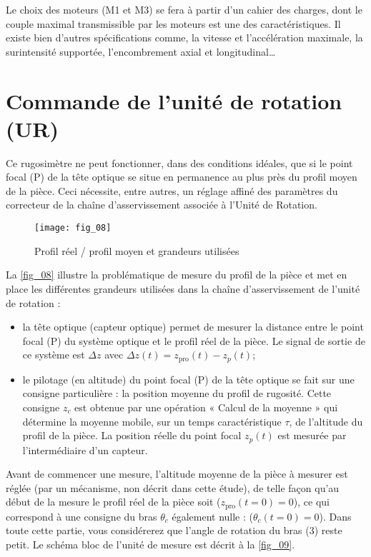\ifprof
\else
Le choix des moteurs (M1 et M3) se fera à partir d’un cahier des charges, dont le couple maximal
transmissible par les moteurs est une des caractéristiques. Il existe bien d’autres spécifications comme, la
vitesse et l’accélération maximale, la surintensité supportée, l’encombrement axial et longitudinal…
\fi

\section{Commande de l'unité de rotation (UR)}

Ce rugosimètre ne peut fonctionner, dans des conditions idéales, que si le point focal (P) de la tête optique
se situe en permanence au plus près du profil moyen de la pièce. Ceci nécessite, entre autres, un réglage
affiné des paramètres du correcteur de la chaîne d’asservissement associée à l’Unité de Rotation.

\begin{figure}[H]
\centering
\texttt{[image: fig\_08]}
\caption{\label{fig_08} Profil réel / profil moyen et grandeurs utilisées}
\end{figure}

La \autoref{fig_08} illustre la problématique de mesure du profil de la pièce et met en place les différentes
grandeurs utilisées dans la chaîne d’asservissement de l’unité de rotation :
\begin{itemize}
\item la tête optique (capteur optique) permet de mesurer la distance entre le point focal (P) du système
optique et le profil réel de la pièce. Le signal de sortie de ce système est $\Delta z$ avec
$\Delta z(t)=z_{\text{pro}}(t)-z_p(t)$;
\item le pilotage (en altitude) du point focal (P) de la tête optique se fait sur une consigne particulière : la
position moyenne du profil de rugosité. Cette consigne $z_c$ est obtenue par une opération « Calcul de
la moyenne » qui détermine la moyenne mobile, sur un temps caractéristique $\tau$, de l’altitude du
profil de la pièce. La position réelle du point focal $z_p(t)$ est mesurée par l’intermédiaire d’un
capteur.
\end{itemize}
Avant de commencer une mesure, l’altitude moyenne de la pièce à mesurer est réglée (par un mécanisme,
non décrit dans cette étude), de telle façon qu’au début de la mesure le profil réel de la pièce soit
($z_{\text{pro}}(t=0)=0$), ce qui correspond à une consigne du bras $\theta_c$ également nulle : ($\theta_{c}(t=0)=0$).
Dans toute cette partie, vous considérerez que l’angle de rotation du bras (3) reste petit.
Le schéma bloc de l’unité de mesure est décrit à la \autoref{fig_09}.


